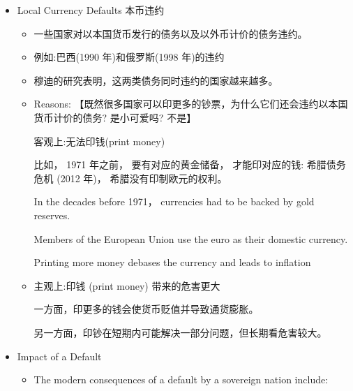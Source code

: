 \begin{itemize}
\begin{itemize}
\begin{itemize}
    \item 违约是由金融、经济和政治问题共同造成的，这些问题在最初发放贷款时基本上是无法预见的。

    \item 举例来说， 美国政府可以通过印刷更多的美元来偿还以美元发行的债务 (被称为增加货币供应量，并可能导致通货膨胀)。然而，像阿根廷这样的国家在借入美元时就无法用印美元的方式来还钱。

    \item 例如:希腊债务危机:南美的有些国家在过去 200 年中多次违约。
\end{itemize}

\item Local Currency Defaults 本币违约
\begin{itemize}

    \item 一些国家对以本国货币发行的债务以及以外币计价的债务违约。

    \item 例如:巴西(1990 年)和俄罗斯(1998 年)的违约

    \item 穆迪的研究表明，这两类债务同时违约的国家越来越多。

    \item Reasons: 【既然很多国家可以印更多的钞票，为什么它们还会违约以本国货币计价的债务? 是小可爱吗? 不是】

 客观上:无法印钱(print money)

比如， 1971 年之前， 要有对应的黄金储备， 才能印对应的钱: 希腊债务危机 (2012 年)， 希腊没有印制欧元的权利。

 In the decades before 1971， currencies had to be backed by gold reserves.

 Members of the European Union use the euro as their domestic currency.

 Printing more money debases the currency and leads to inflation

 \item  主观上:印钱 (print money) 带来的危害更大

 一方面，印更多的钱会使货币贬值并导致通货膨胀。

 另一方面，印钞在短期内可能解决一部分问题，但长期看危害较大。
\end{itemize}
\item Impact of a Default
\begin{itemize}
    

    \item     The modern consequences of a default by a sovereign nation include:


\end{itemize}
\end{itemize}
\end{itemize}
